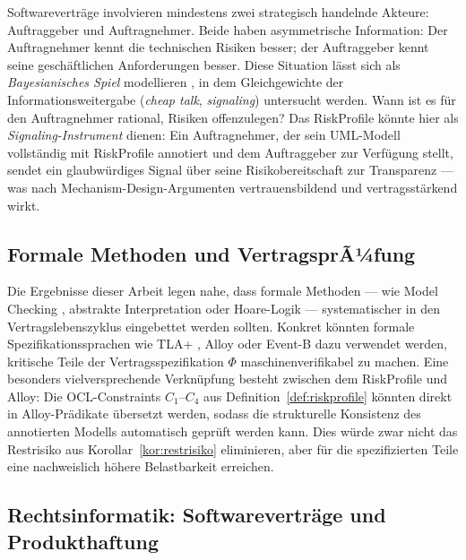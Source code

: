 ﻿\documentclass[a4paper,12pt]{article}
\theoremstyle{definition}
\begin{document}
Softwarevertr\"age involvieren mindestens zwei strategisch handelnde Akteure: Auftraggeber
und Auftragnehmer. Beide haben asymmetrische Information: Der Auftragnehmer kennt die
technischen Risiken besser; der Auftraggeber kennt seine gesch\"aftlichen Anforderungen
besser. Diese Situation l\"asst sich als \emph{Bayesianisches Spiel} modellieren
\cite{harsanyi1967}, in dem Gleichgewichte der Informationsweitergabe (\emph{cheap talk},
\emph{signaling}) untersucht werden. Wann ist es f\"ur den Auftragnehmer rational, Risiken
offenzulegen? Das \textsf{RiskProfile} k\"onnte hier als \emph{Signaling-Instrument}
dienen: Ein Auftragnehmer, der sein UML-Modell vollst\"andig mit \textsf{RiskProfile}
annotiert und dem Auftraggeber zur Verf\"ugung stellt, sendet ein glaubw\"urdiges Signal
\"uber seine Risikobereitschaft zur Transparenz --- was nach Mechanism-Design-Argumenten
\cite{harsanyi1967} vertrauensbildend und vertragsst\"arkend wirkt.

\subsection{Formale Methoden und VertragsprÃ¼fung}

Die Ergebnisse dieser Arbeit legen nahe, dass formale Methoden --- wie Model Checking
\cite{clarke1999}, abstrakte Interpretation \cite{cousot1977} oder Hoare-Logik
\cite{hoare1969} --- systematischer in den Vertragslebenszyklus eingebettet werden
sollten. Konkret k\"onnten formale Spezifikationssprachen wie TLA+ \cite{lamport2002},
Alloy oder Event-B dazu verwendet werden, kritische Teile der Vertragsspezifikation
$\Phi$ maschinenverifikabel zu machen. Eine besonders vielversprechende Verkn\"upfung
besteht zwischen dem \textsf{RiskProfile} und Alloy: Die OCL-Constraints
$C_1$--$C_4$ aus Definition~\ref{def:riskprofile} k\"onnten direkt in Alloy-Pr\"adikate
\"ubersetzt werden, sodass die strukturelle Konsistenz des annotierten Modells automatisch
gepr\"uft werden kann. Dies w\"urde zwar nicht das Restrisiko aus Korollar~\ref{kor:restrisiko}
eliminieren, aber f\"ur die spezifizierten Teile eine nachweislich h\"ohere Belastbarkeit
erreichen.

\subsection{Rechtsinformatik: Softwarevertr\"age und Produkthaftung}
\end{document}
